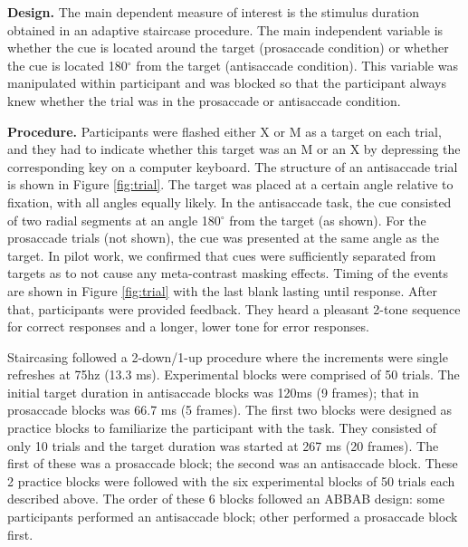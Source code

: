 \documentclass[
  ,man,floatsintext]{apa6}
\begin{document}
\textbf{Design.} The main dependent measure of interest is the stimulus duration obtained in an adaptive staircase procedure. The main independent variable is whether the cue is located around the target (prosaccade condition) or whether the cue is located 180\(^\circ\) from the target (antisaccade condition). This variable was manipulated within participant and was blocked so that the participant always knew whether the trial was in the prosaccade or antisaccade condition.

\textbf{Procedure.} Participants were flashed either X or M as a target on each trial, and they had to indicate whether this target was an M or an X by depressing the corresponding key on a computer keyboard. The structure of an antisaccade trial is shown in Figure \ref{fig:trial}. The target was placed at a certain angle relative to fixation, with all angles equally likely. In the antisaccade task, the cue consisted of two radial segments at an angle 180\(^\circ\) from the target (as shown). For the prosaccade trials (not shown), the cue was presented at the same angle as the target. In pilot work, we confirmed that cues were sufficiently separated from targets as to not cause any meta-contrast masking effects. Timing of the events are shown in Figure \ref{fig:trial} with the last blank lasting until response. After that, participants were provided feedback. They heard a pleasant 2-tone sequence for correct responses and a longer, lower tone for error responses.

Staircasing followed a 2-down/1-up procedure where the increments were single refreshes at 75hz (13.3 ms). Experimental blocks were comprised of 50 trials. The initial target duration in antisaccade blocks was 120ms (9 frames); that in prosaccade blocks was 66.7 ms (5 frames). The first two blocks were designed as practice blocks to familiarize the participant with the task. They consisted of only 10 trials and the target duration was started at 267 ms (20 frames). The first of these was a prosaccade block; the second was an antisaccade block. These 2 practice blocks were followed with the six experimental blocks of 50 trials each described above. The order of these 6 blocks followed an ABBAB design: some participants performed an antisaccade block; other performed a prosaccade block first.
\end{document}
